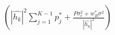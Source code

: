 \documentclass[preview]{standalone}
\begin{document}
\begin{align*}
\left(\left|\hat{h_k}\right|^2 \sum_{j=1}^{K-1} {p_j^\ast} + \frac{P \sigma_{\epsilon}^2 + w_B^\ast \sigma^2}{\left|\hat{h_k}\right|^2}\right)
\end{align*}
\end{document}
